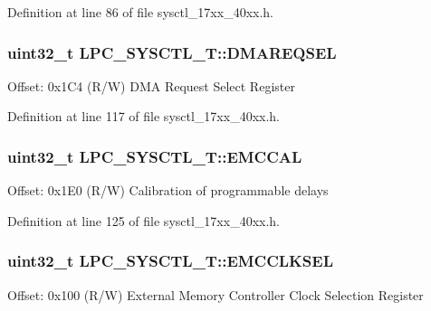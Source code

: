 Definition at line 86 of file sysctl\+\_\+17xx\+\_\+40xx.\+h.

\subsubsection[{\texorpdfstring{D\+M\+A\+R\+E\+Q\+S\+EL}{DMAREQSEL}}]{ uint32\+\_\+t L\+P\+C\+\_\+\+S\+Y\+S\+C\+T\+L\+\_\+\+T\+::\+D\+M\+A\+R\+E\+Q\+S\+EL}\hypertarget{structLPC__SYSCTL__T_a1915d9b403571a380a581c82352b8e4a}{}\label{structLPC__SYSCTL__T_a1915d9b403571a380a581c82352b8e4a}
Offset\+: 0x1\+C4 (R/W) D\+MA Request Select Register 

Definition at line 117 of file sysctl\+\_\+17xx\+\_\+40xx.\+h.

\subsubsection[{\texorpdfstring{E\+M\+C\+C\+AL}{EMCCAL}}]{ uint32\+\_\+t L\+P\+C\+\_\+\+S\+Y\+S\+C\+T\+L\+\_\+\+T\+::\+E\+M\+C\+C\+AL}\hypertarget{structLPC__SYSCTL__T_aa7c40eaca1081f3133eda04395be6fa6}{}\label{structLPC__SYSCTL__T_aa7c40eaca1081f3133eda04395be6fa6}
Offset\+: 0x1\+E0 (R/W) Calibration of programmable delays 

Definition at line 125 of file sysctl\+\_\+17xx\+\_\+40xx.\+h.

\subsubsection[{\texorpdfstring{E\+M\+C\+C\+L\+K\+S\+EL}{EMCCLKSEL}}]{ uint32\+\_\+t L\+P\+C\+\_\+\+S\+Y\+S\+C\+T\+L\+\_\+\+T\+::\+E\+M\+C\+C\+L\+K\+S\+EL}\hypertarget{structLPC__SYSCTL__T_a23152315a7ac650737bf1b3852bab194}{}\label{structLPC__SYSCTL__T_a23152315a7ac650737bf1b3852bab194}
Offset\+: 0x100 (R/W) External Memory Controller Clock Selection Register 

